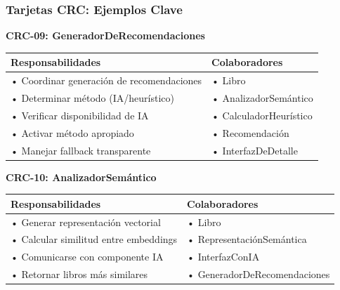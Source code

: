 \documentclass[aspectratio=169]{beamer}
\begin{document}
\begin{frame}
\frametitle{Tarjetas CRC: Ejemplos Clave}

\textbf{CRC-09: GeneradorDeRecomendaciones}

\begin{table}
\centering
\small
\begin{tabular}{p{5cm}p{7cm}}
\toprule
\textbf{Responsabilidades} & \textbf{Colaboradores} \\
\midrule
• Coordinar generación de recomendaciones & • Libro \\
• Determinar método (IA/heurístico) & • AnalizadorSemántico \\
• Verificar disponibilidad de IA & • CalculadorHeurístico \\
• Activar método apropiado & • Recomendación \\
• Manejar fallback transparente & • InterfazDeDetalle \\
\bottomrule
\end{tabular}
\end{table}

\vspace{0.3cm}

\textbf{CRC-10: AnalizadorSemántico}

\begin{table}
\centering
\small
\begin{tabular}{p{5cm}p{7cm}}
\toprule
\textbf{Responsabilidades} & \textbf{Colaboradores} \\
\midrule
• Generar representación vectorial & • Libro \\
• Calcular similitud entre embeddings & • RepresentaciónSemántica \\
• Comunicarse con componente IA & • InterfazConIA \\
• Retornar libros más similares & • GeneradorDeRecomendaciones \\
\bottomrule
\end{tabular}
\end{table}

\end{frame}
\end{document}
